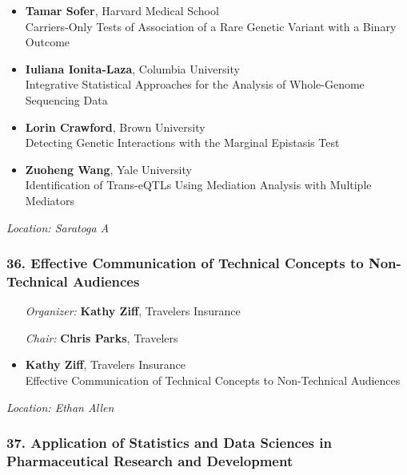 \begin{itemize}
\item \textbf{Tamar Sofer}, Harvard Medical School \\
Carriers-Only Tests of Association of a Rare Genetic Variant with a Binary Outcome
\item \textbf{Iuliana Ionita-Laza}, Columbia University \\
Integrative Statistical Approaches for the Analysis of Whole-Genome Sequencing Data
\item \textbf{Lorin Crawford}, Brown University \\
Detecting Genetic Interactions with the Marginal Epistasis Test
\item \textbf{Zuoheng Wang}, Yale University \\
Identification of Trans-eQTLs Using Mediation Analysis with Multiple Mediators
\end{itemize}

\emph{Location: Saratoga A}

\subsubsection*{36. Effective Communication of Technical Concepts to Non-Technical Audiences}

\begin{enumerate}[align=left]
\item [\emph{Organizer:}] \textbf{Kathy Ziff}, Travelers Insurance
\item [\emph{Chair:}] \textbf{Chris Parks},  Travelers
\end{enumerate}

\begin{itemize}
\item \textbf{Kathy Ziff}, Travelers Insurance \\
Effective Communication of Technical Concepts to Non-Technical Audiences
\end{itemize}

\emph{Location: Ethan Allen}

\subsubsection*{37. Application of Statistics and Data Sciences in Pharmaceutical Research and Development}


